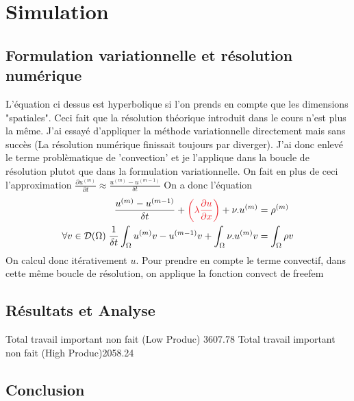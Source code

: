 \documentclass[french]{article}
\begin{document}
    
    \section{Simulation}
    \subsection{Formulation variationnelle et résolution numérique}
    L'équation ci dessus est hyperbolique si l'on prends en compte que les dimensions "spatiales".
    Ceci fait que la résolution théorique introduit dans le cours n'est plus la même. J'ai essayé d'appliquer la méthode
    variationnelle directement mais sans succès (La résolution numérique finissait toujours par diverger). J'ai donc enlevé le terme problèmatique
    de 'convection' et je l'applique dans la boucle de résolution plutot que dans la formulation variationnelle. On fait en plus de ceci l'approximation 
    $\frac{\partial u^{(m)}}{\partial t} \approx \frac{u^{(m)} - u^{(m-1)}}{\delta t}$ On a donc l'équation
    \begin{alignat*}{10}
        \frac{u^{(m)} - u^{(m-1)}}{\delta t} + 
        \textcolor{Red}{\left( \lambda\frac{\partial u}{\partial x}\right)} 
        + \nu.u^{(m)} &= \rho^{(m)} \\
        \forall v \in \mathcal{D}(\Omega) \; \frac{1}{\delta t} \int_{\Omega} u^{(m)}v - u^{(m-1)}v + \int_{\Omega} \nu.u^{(m)}v
        &= \int_{\Omega} \rho v
    \end{alignat*}
    On calcul donc itérativement $u$. Pour prendre en compte le terme convectif, dans cette même boucle de résolution, on applique la fonction convect de freefem 
    \subsection{Résultats et Analyse}
    Total travail important non fait (Low Produc) 3607.78
    Total travail important non fait (High Produc)2058.24
    \subsection{Conclusion}
    
\end{document}
